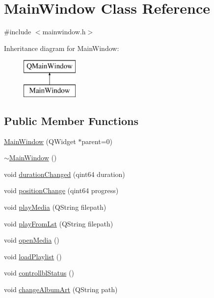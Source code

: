 \hypertarget{class_main_window}{}\section{Main\+Window Class Reference}
\label{class_main_window}


{\ttfamily \#include $<$mainwindow.\+h$>$}

Inheritance diagram for Main\+Window\+:\begin{figure}[H]
\begin{center}
\leavevmode
\includegraphics[height=2.000000cm]{class_main_window}
\end{center}
\end{figure}
\subsection*{Public Member Functions}
\begin{DoxyCompactItemize}
\item 
\mbox{\hyperlink{class_main_window_a8b244be8b7b7db1b08de2a2acb9409db}{Main\+Window}} (Q\+Widget $\ast$parent=0)
\item 
\mbox{\hyperlink{class_main_window_ae98d00a93bc118200eeef9f9bba1dba7}{$\sim$\+Main\+Window}} ()
\item 
void \mbox{\hyperlink{class_main_window_abbf9b15e3b76bd06f13c0198e7ed486b}{duration\+Changed}} (qint64 duration)
\item 
void \mbox{\hyperlink{class_main_window_a1859a3e6fa98e564751865ce24526020}{position\+Change}} (qint64 progress)
\item 
void \mbox{\hyperlink{class_main_window_aa8f59dc598f84267dda1cc7e0120560e}{play\+Media}} (Q\+String filepath)
\item 
void \mbox{\hyperlink{class_main_window_a7c87bfef3bf68130cd604ead9e98f3bd}{play\+From\+Lst}} (Q\+String filepath)
\item 
void \mbox{\hyperlink{class_main_window_a4d1d22c142d53f07ddff0f09e734ec05}{open\+Media}} ()
\item 
void \mbox{\hyperlink{class_main_window_ac877ae03abf6415808e0bb36ff71e5be}{load\+Playlist}} ()
\item 
void \mbox{\hyperlink{class_main_window_afd4837508fd24b55c9a72a2bd2c20ea9}{controllbl\+Status}} ()
\item 
void \mbox{\hyperlink{class_main_window_a221c04adbd574ca3d1256ba1a4db2a94}{change\+Album\+Art}} (Q\+String path)
\end{DoxyCompactItemize}
